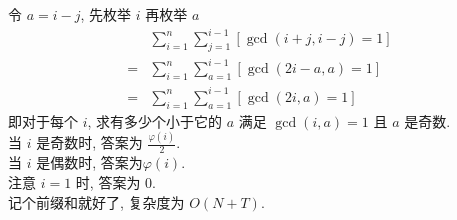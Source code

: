 \documentclass{article}
\begin{document}
    令 $a=i-j$, 先枚举 $i$ 再枚举 $a$
    \begin{align*}
        & \sum_{i=1}^n \sum_{j=1}^{i-1} [\gcd(i+j,i-j)=1]\\
        = & \sum_{i=1}^n \sum_{a=1}^{i-1} [\gcd(2i-a,a)=1]\\
        = & \sum_{i=1}^n \sum_{a=1}^{i-1} [\gcd(2i,a)=1]
    \end{align*}
    即对于每个 $i$, 求有多少个小于它的 $a$ 满足 $\gcd(i,a)=1$ 且 $a$ 是奇数.\\
    当 $i$ 是奇数时, 答案为 $\frac{\varphi(i)}{2}$.\\
    当 $i$ 是偶数时, 答案为$\varphi(i)$.\\
    注意 $i=1$ 时, 答案为 $0$.\\
    记个前缀和就好了, 复杂度为 $O(N+T)$.\\
\end{document}
